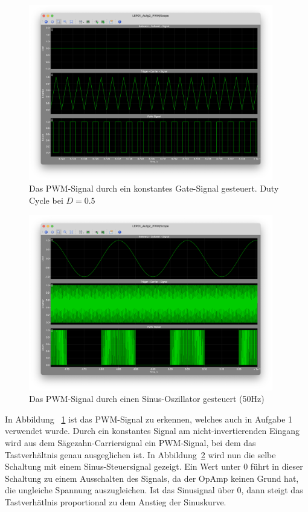 \documentclass{report}
\begin{document}
\begin{figure}[hbt!]
	\begin{center}
		\includegraphics[width=0.95\textwidth]{assets/img/aufg2_pwm_c.png}
	\end{center}
	\caption{Das PWM-Signal durch ein konstantes Gate-Signal gesteuert. Duty Cycle bei $D=0.5$}
	\label{fig:aufg2_pwm_c}
\end{figure}

\begin{figure}[hbt!]
	\begin{center}
		\includegraphics[width=0.95\textwidth]{assets/img/aufg2_pwm_sin.png}
	\end{center}
	\caption{Das PWM-Signal durch einen Sinus-Oszillator gesteuert (50Hz)}
	\label{fig:aufg2_pwm_sin}
\end{figure}

In Abbildung ~\ref{fig:aufg2_pwm_c} ist das PWM-Signal zu erkennen, welches auch in Aufgabe 1 verwendet wurde. Durch ein konstantes Signal am nicht-invertierenden Eingang wird aus dem Sägezahn-Carriersignal ein PWM-Signal, bei dem das Tastverhältnis genau ausgeglichen ist.
In Abbildung~\ref{fig:aufg2_pwm_sin} wird nun die selbe Schaltung mit einem Sinus-Steuersignal gezeigt. Ein Wert unter 0 führt in dieser Schaltung zu einem Ausschalten des Signals, da der OpAmp keinen Grund hat, die ungleiche Spannung auszugleichen. Ist das Sinusignal über 0, dann steigt das Tastverhätlnis proportional zu dem Anstieg der Sinuskurve.
\end{document}
